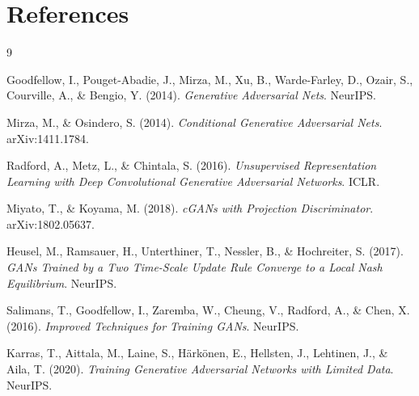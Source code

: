 \section*{References}

\begin{thebibliography}{9}

Goodfellow, I., Pouget-Abadie, J., Mirza, M., Xu, B., Warde-Farley, D., Ozair, S., Courville, A., \& Bengio, Y. (2014). \textit{Generative Adversarial Nets}. NeurIPS.

Mirza, M., \& Osindero, S. (2014). \textit{Conditional Generative Adversarial Nets}. arXiv:1411.1784.

Radford, A., Metz, L., \& Chintala, S. (2016). \textit{Unsupervised Representation Learning with Deep Convolutional Generative Adversarial Networks}. ICLR.

Miyato, T., \& Koyama, M. (2018). \textit{cGANs with Projection Discriminator}. arXiv:1802.05637.

Heusel, M., Ramsauer, H., Unterthiner, T., Nessler, B., \& Hochreiter, S. (2017). \textit{GANs Trained by a Two Time-Scale Update Rule Converge to a Local Nash Equilibrium}. NeurIPS.

Salimans, T., Goodfellow, I., Zaremba, W., Cheung, V., Radford, A., \& Chen, X. (2016). \textit{Improved Techniques for Training GANs}. NeurIPS.

Karras, T., Aittala, M., Laine, S., Härkönen, E., Hellsten, J., Lehtinen, J., \& Aila, T. (2020). \textit{Training Generative Adversarial Networks with Limited Data}. NeurIPS.

\end{thebibliography}
